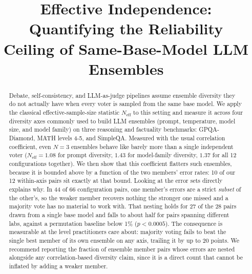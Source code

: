 \documentclass[conference]{IEEEtran}
\begin{document}
\title{Effective Independence: Quantifying the Reliability\\
Ceiling of Same-Base-Model LLM Ensembles}

\author{
\and
{}
}

\maketitle

\begin{abstract}
Debate, self-consistency, and LLM-as-judge pipelines assume ensemble
diversity they do not actually have when every voter is sampled from the
same base model. We apply the classical effective-sample-size statistic
$N_\text{eff}$ to this setting and measure it across four diversity axes commonly used to
build LLM ensembles (prompt, temperature, model size, and model family)
on three reasoning and factuality benchmarks: GPQA-Diamond, MATH levels 4-5,
and SimpleQA. Measured with the usual correlation coefficient, even $N=3$ ensembles behave
like barely more than a single independent voter ($N_\text{eff}=1.08$ for
prompt diversity, $1.43$ for model-family diversity, $1.37$ for all 12
configurations together). We then show that this coefficient flatters such
ensembles, because it is bounded above by a function of the two members'
error rates: 10 of our 12 within-axis pairs sit exactly at that bound.
Looking at the error sets directly explains why. In 44 of 66 configuration
pairs, one member's errors are a strict \emph{subset} of the other's, so the
weaker member recovers nothing the stronger one missed and a majority vote
has no material to work with. That nesting holds for 27 of the 28 pairs drawn
from a single base model and falls to about half for pairs spanning different
labs, against a permutation baseline below 1\% ($p<0.0005$). The consequence
is measurable at the level practitioners care about: majority voting fails to
beat the single best member of its own ensemble on any axis, trailing it by
up to 20 points. We
recommend reporting the fraction of ensemble member pairs whose errors are
nested alongside any correlation-based diversity claim, since it is a direct
count that cannot be inflated by adding a weaker member.
\end{abstract}
\end{document}
